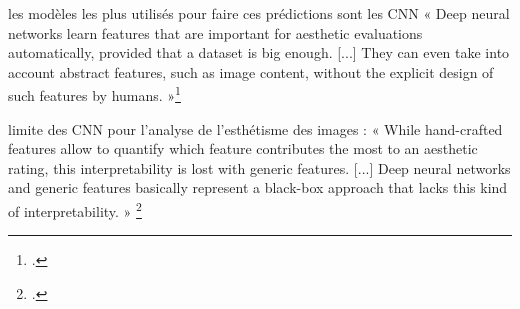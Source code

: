 \begin{itemize}
les modèles les plus utilisés pour faire ces prédictions sont les CNN « Deep neural networks learn features that are important for aesthetic evaluations automatically, provided that a dataset is big enough. [...] They can even take into account abstract features, such as image content, without the explicit design of such features by humans. »\footcite{brachmann2017}

limite des CNN pour l'analyse de l'esthétisme des images : « While hand-crafted features allow to quantify which feature contributes the most to an aesthetic rating, this interpretability is lost with generic features. [...] Deep neural networks and generic features basically represent a black-box approach that lacks this kind of interpretability. » \footcite{brachmann2017}



\end{itemize}
